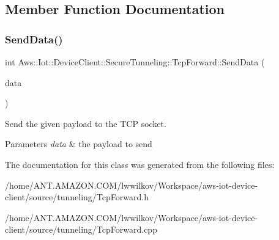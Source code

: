 \subsection{Member Function Documentation}
\mbox{\label{class_aws_1_1_iot_1_1_device_client_1_1_secure_tunneling_1_1_tcp_forward_aa20aab4ae6ecd3004100da9976b95310}} 
\subsubsection{\texorpdfstring{Send\+Data()}{SendData()}}
{\footnotesize\ttfamily int Aws\+::\+Iot\+::\+Device\+Client\+::\+Secure\+Tunneling\+::\+Tcp\+Forward\+::\+Send\+Data (\begin{DoxyParamCaption}\item[{const Crt\+::\+Byte\+Cursor \&}]{data }\end{DoxyParamCaption})}



Send the given payload to the T\+CP socket. 


\begin{DoxyParams}{Parameters}
{\em data} & the payload to send \\
\hline
\end{DoxyParams}


The documentation for this class was generated from the following files\+:\begin{DoxyCompactItemize}
\item 
/home/\+A\+N\+T.\+A\+M\+A\+Z\+O\+N.\+C\+O\+M/lwwilkov/\+Workspace/aws-\/iot-\/device-\/client/source/tunneling/Tcp\+Forward.\+h\item 
/home/\+A\+N\+T.\+A\+M\+A\+Z\+O\+N.\+C\+O\+M/lwwilkov/\+Workspace/aws-\/iot-\/device-\/client/source/tunneling/Tcp\+Forward.\+cpp\end{DoxyCompactItemize}
